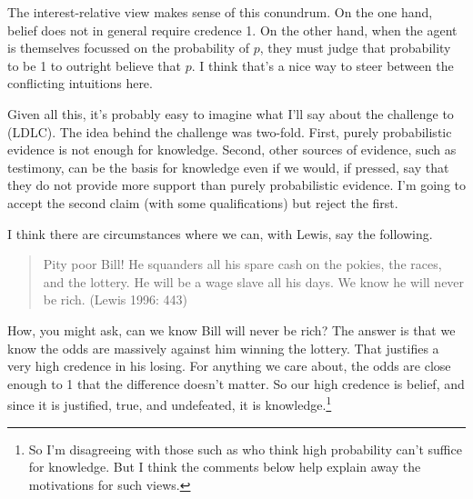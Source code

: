 The interest-relative view makes sense of this conundrum. On the one hand, belief does not in general require credence 1. On the other hand, when the agent is themselves focussed on the probability of $p$, they must judge that probability to be 1 to outright believe that $p$. I think that's a nice way to steer between the conflicting intuitions here.

Given all this, it's probably easy to imagine what I'll say about the challenge to (LDLC). The idea behind the challenge was two-fold. First, purely probabilistic evidence is not enough for knowledge. Second, other sources of evidence, such as testimony, can be the basis for knowledge even if we would, if pressed, say that they do not provide more support than purely probabilistic evidence. I'm going to accept the second claim (with some qualifications) but reject the first.

I think there are circumstances where we can, with Lewis, say the following.

\begin{quote} Pity poor Bill! He squanders all his spare cash on the pokies, the races, and the lottery. He will be a wage slave all his days. We know he will never be rich. (Lewis 1996: 443)\end{quote}

\noindent How, you might ask, can we know Bill will never be rich? The answer is that we know the odds are massively against him winning the lottery. That justifies a very high credence in his losing. For anything we care about, the odds are close enough to 1 that the difference doesn't matter. So our high credence is belief, and since it is justified, true, and undefeated, it is knowledge.\footnote{So I'm disagreeing with those such as \citet{Nelkin2000} who think high probability can't suffice for knowledge. But I think the comments below help explain away the motivations for such views.}

